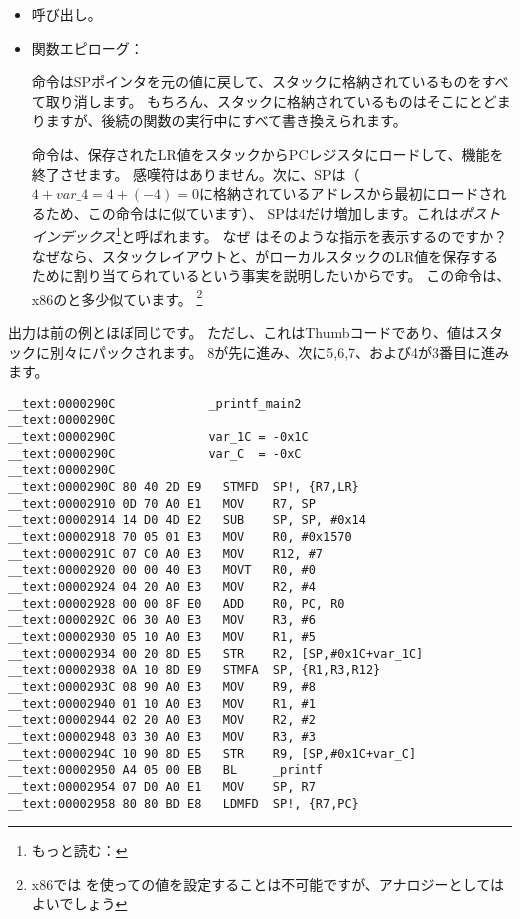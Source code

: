\begin{itemize}
\item \printf 呼び出し。

\item 関数エピローグ：

命令は\ac{SP}ポインタを元の値に戻して、スタックに格納されているものをすべて取り消します。
もちろん、スタックに格納されているものはそこにとどまりますが、後続の関数の実行中にすべて書き換えられます。

命令は、保存された\ac{LR}値をスタックから\ac{PC}レジスタにロードして、機能を終了させます。
感嘆符はありません。次に、\ac{SP}は（$4+var\_4=4+(-4)=0$に格納されているアドレスから最初にロードされるため、この命令はに似ています）、 \ac{SP}は4だけ増加します。これは\emph{ポストインデックス}\footnote{もっと読む： }と呼ばれます。
なぜ \IDA はそのような指示を表示するのですか？
なぜなら、スタックレイアウトと、がローカルスタックの\ac{LR}値を保存するために割り当てられているという事実を説明したいからです。
この命令は、x86のと多少似ています。
\footnote{x86では \POP を使っての値を設定することは不可能ですが、アナロジーとしてはよいでしょう}

\end{itemize}

\myparagraph{\OptimizingKeilVI: \ThumbMode}



出力は前の例とほぼ同じです。 ただし、これはThumbコードであり、値はスタックに別々にパックされます。
8が先に進み、次に5,6,7、および4が3番目に進みます。

\myparagraph{\OptimizingXcodeIV: \ARMMode}

\begin{lstlisting}[style=customasmARM]
__text:0000290C             _printf_main2
__text:0000290C
__text:0000290C             var_1C = -0x1C
__text:0000290C             var_C  = -0xC
__text:0000290C
__text:0000290C 80 40 2D E9   STMFD  SP!, {R7,LR}
__text:00002910 0D 70 A0 E1   MOV    R7, SP
__text:00002914 14 D0 4D E2   SUB    SP, SP, #0x14
__text:00002918 70 05 01 E3   MOV    R0, #0x1570
__text:0000291C 07 C0 A0 E3   MOV    R12, #7
__text:00002920 00 00 40 E3   MOVT   R0, #0
__text:00002924 04 20 A0 E3   MOV    R2, #4
__text:00002928 00 00 8F E0   ADD    R0, PC, R0
__text:0000292C 06 30 A0 E3   MOV    R3, #6
__text:00002930 05 10 A0 E3   MOV    R1, #5
__text:00002934 00 20 8D E5   STR    R2, [SP,#0x1C+var_1C]
__text:00002938 0A 10 8D E9   STMFA  SP, {R1,R3,R12}
__text:0000293C 08 90 A0 E3   MOV    R9, #8
__text:00002940 01 10 A0 E3   MOV    R1, #1
__text:00002944 02 20 A0 E3   MOV    R2, #2
__text:00002948 03 30 A0 E3   MOV    R3, #3
__text:0000294C 10 90 8D E5   STR    R9, [SP,#0x1C+var_C]
__text:00002950 A4 05 00 EB   BL     _printf
__text:00002954 07 D0 A0 E1   MOV    SP, R7
__text:00002958 80 80 BD E8   LDMFD  SP!, {R7,PC}
\end{lstlisting}


